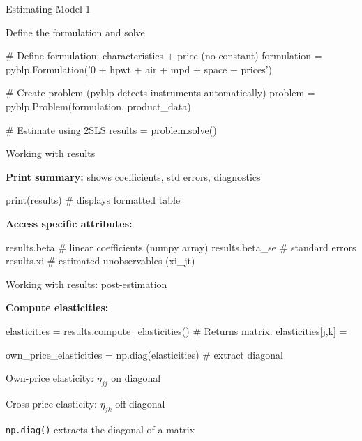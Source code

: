 \documentclass[notes,11pt, aspectratio=169]{beamer}
\newenvironment{wideitemize}{\itemize\addtolength{\itemsep}{10pt}}{\enditemize}
\begin{document}
\begin{frame}[fragile]{Estimating Model 1}
\begin{wideitemize}
	\item Define the formulation and solve
\end{wideitemize}
\vspace{5pt}
\begin{pycode}
# Define formulation: characteristics + price (no constant)
formulation = pyblp.Formulation('0 + hpwt + air + mpd + space + prices')

# Create problem (pyblp detects instruments automatically)
problem = pyblp.Problem(formulation, product_data)

# Estimate using 2SLS
results = problem.solve()
\end{pycode}
\end{frame}

\begin{frame}[fragile]{Working with results}
	\begin{wideitemize}
		\item \textbf{Print summary:} shows coefficients, std errors, diagnostics
	\end{wideitemize}
\begin{pycode}
print(results)  # displays formatted table
\end{pycode}
	\vspace{8pt}
	\begin{wideitemize}
		\item \textbf{Access specific attributes:}
	\end{wideitemize}
\begin{pycode}
results.beta          # linear coefficients (numpy array)
results.beta_se       # standard errors
results.xi            # estimated unobservables (xi_jt)
\end{pycode}
\end{frame}

\begin{frame}[fragile]{Working with results: post-estimation}
	\begin{wideitemize}
		\item \textbf{Compute elasticities:}
	\end{wideitemize}
\begin{pycode}
elasticities = results.compute_elasticities()
# Returns matrix: elasticities[j,k] = %

own_price_elasticities = np.diag(elasticities)  # extract diagonal
\end{pycode}
	\vspace{8pt}
	\begin{wideitemize}
		\item Own-price elasticity: $\eta_{jj}$ on diagonal
		\item Cross-price elasticity: $\eta_{jk}$ off diagonal
		\item \texttt{np.diag()} extracts the diagonal of a matrix
	\end{wideitemize}
\end{frame}
\end{document}
